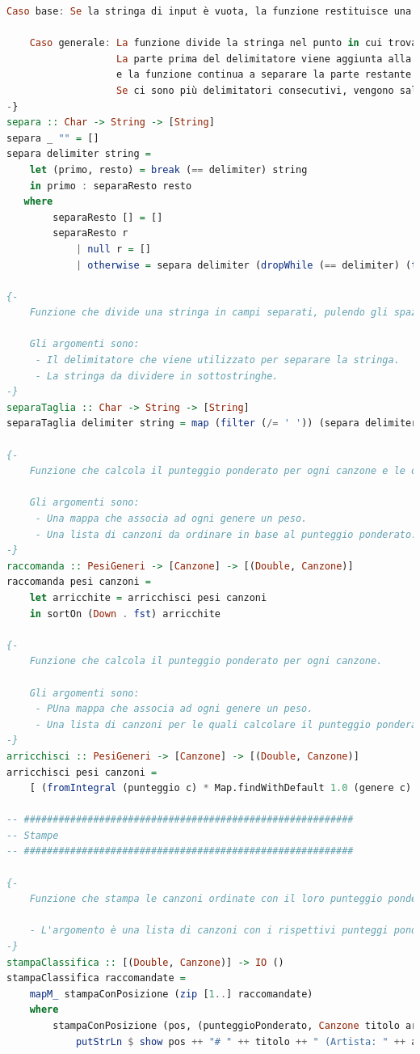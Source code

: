 \documentclass[a4paper,11pt]{article}
\begin{document}
\begin{lstlisting}[language=Haskell]
    Caso base: Se la stringa di input è vuota, la funzione restituisce una lista vuota.

    Caso generale: La funzione divide la stringa nel punto in cui trova il delimitatore.
                   La parte prima del delimitatore viene aggiunta alla lista risultante,
                   e la funzione continua a separare la parte restante della stringa.
                   Se ci sono più delimitatori consecutivi, vengono saltati e la separazione continua.
-}
separa :: Char -> String -> [String]
separa _ "" = []
separa delimiter string =
    let (primo, resto) = break (== delimiter) string
    in primo : separaResto resto
   where
        separaResto [] = []
        separaResto r
            | null r = []
            | otherwise = separa delimiter (dropWhile (== delimiter) (tail r))

{-
    Funzione che divide una stringa in campi separati, pulendo gli spazi.

    Gli argomenti sono:
     - Il delimitatore che viene utilizzato per separare la stringa.
     - La stringa da dividere in sottostringhe.
-}
separaTaglia :: Char -> String -> [String]
separaTaglia delimiter string = map (filter (/= ' ')) (separa delimiter string)

{-
    Funzione che calcola il punteggio ponderato per ogni canzone e le ordina.

    Gli argomenti sono:
     - Una mappa che associa ad ogni genere un peso.
     - Una lista di canzoni da ordinare in base al punteggio ponderato.
-}
raccomanda :: PesiGeneri -> [Canzone] -> [(Double, Canzone)]
raccomanda pesi canzoni =
    let arricchite = arricchisci pesi canzoni
    in sortOn (Down . fst) arricchite

{-
    Funzione che calcola il punteggio ponderato per ogni canzone.

    Gli argomenti sono:
     - PUna mappa che associa ad ogni genere un peso.
     - Una lista di canzoni per le quali calcolare il punteggio ponderato.
-}
arricchisci :: PesiGeneri -> [Canzone] -> [(Double, Canzone)]
arricchisci pesi canzoni =
    [ (fromIntegral (punteggio c) * Map.findWithDefault 1.0 (genere c) pesi, c) | c <- canzoni ]

-- #########################################################
-- Stampe
-- #########################################################

{-
    Funzione che stampa le canzoni ordinate con il loro punteggio ponderato.

    - L'argomento è una lista di canzoni con i rispettivi punteggi ponderati.
-}
stampaClassifica :: [(Double, Canzone)] -> IO ()
stampaClassifica raccomandate =
    mapM_ stampaConPosizione (zip [1..] raccomandate)
    where
        stampaConPosizione (pos, (punteggioPonderato, Canzone titolo artista genere _)) = do
            putStrLn $ show pos ++ "# " ++ titolo ++ " (Artista: " ++ artista ++ ", Genere: " ++ genere ++ ", Punteggio Ponderato: " ++ show punteggioPonderato


\end{lstlisting}
\end{document}
